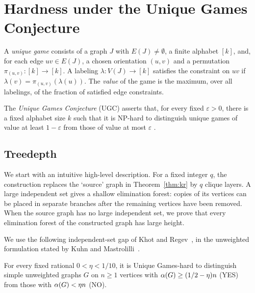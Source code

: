 \section{Hardness under the Unique Games Conjecture}
\label{sec:ugc}

A \emph{unique game} consists of a graph $J$ with $E(J)\ne\emptyset$,
a finite alphabet $[k]$, and, for each edge $uv\in E(J)$, a chosen
orientation $(u,v)$ and a permutation $\pi_{(u,v)}:[k]\to[k]$.
A labeling $\lambda:V(J)\to[k]$ satisfies the constraint on $uv$ if
$\lambda(v)=\pi_{(u,v)}(\lambda(u))$. The \emph{value} of the game is the maximum,
over all labelings, of the fraction of satisfied edge constraints.

The \emph{Unique Games Conjecture} (\textup{UGC}) asserts that, for every
fixed $\varepsilon>0$, there is a fixed alphabet size $k$ such that it is
\textup{NP}-hard to distinguish unique games of value at least
$1-\varepsilon$ from those of value at most $\varepsilon$
\cite{KhotRegev}.


\subsection{Treedepth}
\label{subsec:ugc-treedepth}

We start with an intuitive high-level description.
For a fixed integer $q$, the construction replaces the `source' graph in Theorem~\ref{thm:kr} by
$q$ clique layers. A large independent set gives a shallow elimination forest: copies
of its vertices can be placed in separate branches after the remaining vertices have
been removed. When the source graph has no large independent set, we
prove that every elimination forest of the constructed graph has large height.

We use the following independent-set gap of Khot and Regev~\cite{KhotRegev},
in the unweighted formulation stated by Kuhn and
Mastrolilli~\cite[Theorem~7]{KuhnMastrolilli2011}.

\begin{theorem}\label{thm:kr}
For every fixed rational $0<\eta<1/10$, it is Unique Games-hard to
distinguish simple unweighted graphs $G$ on $n\geq1$ vertices with
$\alpha(G)\geq(1/2-\eta)n$ \textup{(YES)} from those with
$\alpha(G)<\eta n$ \textup{(NO)}.
\end{theorem}

